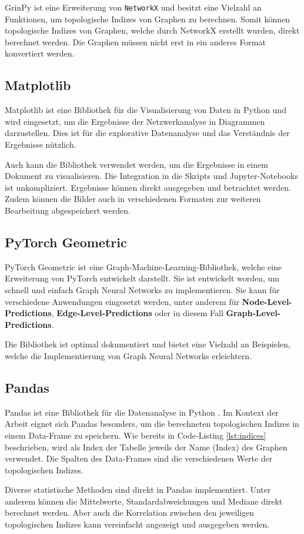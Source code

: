 GrinPy ist eine Erweiterung von \texttt{NetworkX} und besitzt eine Vielzahl an Funktionen, um topologische Indizes von Graphen zu berechnen.
Somit können topologische Indizes von Graphen, welche durch NetworkX erstellt wurden, direkt berechnet werden. Die Graphen müssen nicht erst in ein anderes Format konvertiert werden.

\subsection{Matplotlib}

Matplotlib ist eine Bibliothek für die Visualisierung von Daten in Python \cite{Hunter:2007} und wird eingesetzt, um die Ergebnisse der Netzwerkanalyse in Diagrammen darzustellen.
Dies ist für die explorative Datenanalyse und das Verständnis der Ergebnisse nützlich.

Auch kann die Bibliothek verwendet werden, um die Ergebnisse in einem Dokument zu visualisieren.
Die Integration in die Skripts und Jupyter-Notebooks ist unkompliziert. Ergebnisse können direkt ausgegeben und betrachtet werden.
Zudem können die Bilder auch in verschiedenen Formaten zur weiteren Bearbeitung abgespeichert werden.

\subsection{PyTorch Geometric}

PyTorch Geometric \cite{fey_lenssen_2019} ist eine Graph-Machine-Learning-Bibliothek, welche eine Erweiterung von PyTorch \cite{Paszke_PyTorch_An_Imperative_2019} entwickelt darstellt.
Sie ist entwickelt worden, um schnell und einfach Graph Neural Networks zu implementieren.
Sie kann für verschiedene Anwendungen eingesetzt werden, unter anderem für \textbf{Node-Level-Predictions}, \textbf{Edge-Level-Predictions} oder in diesem Fall \textbf{Graph-Level-Predictions}.

Die Bibliothek ist optimal dokumentiert und bietet eine Vielzahl an Beispielen, welche die Implementierung von Graph Neural Networks erleichtern.

\subsection{Pandas}

Pandas ist eine Bibliothek für die Datenanalyse in Python \cite{mckinney-proc-scipy-2010}.
Im Kontext der Arbeit eignet sich Pandas besonders, um die berechneten topologischen Indizes in einem Data-Frame zu speichern.
Wie bereits in Code-Listing \ref{lst:indices} beschrieben, wird als Index der Tabelle jeweils der Name (Index) des Graphen verwendet.
Die Spalten des Data-Frames sind die verschiedenen Werte der topologischen Indizes.

Diverse statistische Methoden sind direkt in Pandas implementiert. 
Unter anderem können die Mittelwerte, Standardabweichungen und Mediane direkt berechnet werden. 
Aber auch die Korrelation zwischen den jeweiligen topologischen Indizes kann vereinfacht angezeigt und ausgegeben werden.
